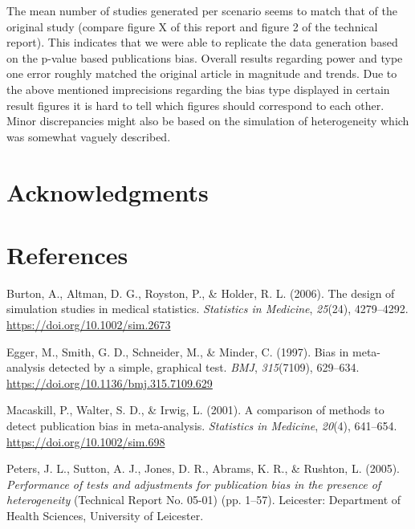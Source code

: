 \documentclass[
  english,
  doc,floatsintext,draftall]{apa6}
\begin{document}
The mean number of studies generated per scenario seems to match that of the original study (compare figure X of this report and figure 2 of the technical report).
This indicates that we were able to replicate the data generation based on the p-value based publications bias.
Overall results regarding power and type one error roughly matched the original article in magnitude and trends.
Due to the above mentioned imprecisions regarding the bias type displayed in certain result figures it is hard to tell which figures should correspond to each other. Minor discrepancies might also be based on the simulation of heterogeneity which was somewhat vaguely described.

\hypertarget{acknowledgments}{%
\section{Acknowledgments}\label{acknowledgments}}

\newpage
\FloatBarrier

\hypertarget{references}{%
\section{References}\label{references}}

\begingroup
\setlength{\parindent}{-0.5in}
\setlength{\leftskip}{0.5in}

\hypertarget{refs}{}
\leavevmode\hypertarget{ref-burton_design_2006}{}%
Burton, A., Altman, D. G., Royston, P., \& Holder, R. L. (2006). The design of simulation studies in medical statistics. \emph{Statistics in Medicine}, \emph{25}(24), 4279--4292. \url{https://doi.org/10.1002/sim.2673}

\leavevmode\hypertarget{ref-egger_bias_1997}{}%
Egger, M., Smith, G. D., Schneider, M., \& Minder, C. (1997). Bias in meta-analysis detected by a simple, graphical test. \emph{BMJ}, \emph{315}(7109), 629--634. \url{https://doi.org/10.1136/bmj.315.7109.629}

\leavevmode\hypertarget{ref-macaskill_comparison_2001}{}%
Macaskill, P., Walter, S. D., \& Irwig, L. (2001). A comparison of methods to detect publication bias in meta-analysis. \emph{Statistics in Medicine}, \emph{20}(4), 641--654. \url{https://doi.org/10.1002/sim.698}

\leavevmode\hypertarget{ref-peters_performance_2005}{}%
Peters, J. L., Sutton, A. J., Jones, D. R., Abrams, K. R., \& Rushton, L. (2005). \emph{Performance of tests and adjustments for publication bias in the presence of heterogeneity} (Technical Report No. 05-01) (pp. 1--57). Leicester: Department of Health Sciences, University of Leicester.
\end{document}
